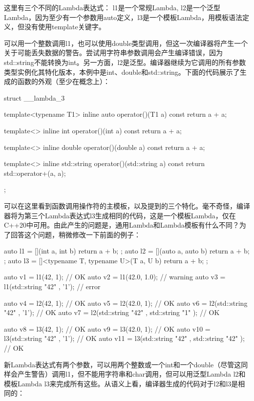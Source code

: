 这里有三个不同的Lambda表达式： l1是一个常规Lambda, l2是一个泛型Lambda，因为至少有一个参数用auto定义，l3是一个模板Lambda，用模板语法定义，但没有使用template关键字。

可以用一个整数调用l1，也可以使用double类型调用，但这一次编译器将产生一个关于可能丢失数据的警告。尝试用字符串参数调用会产生编译错误，因为std::string不能转换为int。另一方面，l2是泛型。编译器继续为它调用的所有参数类型实例化其特化版本，本例中是int、double和std::string。下面的代码展示了生成的函数的外观（至少在概念上）：

\begin{cppcode}
struct __lambda_3
{
	template<typename T1>
	inline auto operator()(T1 a) const
	{
		return a + a;
	}

	template<>
	inline int operator()(int a) const
	{
		return a + a;
	}

	template<>
	inline double operator()(double a) const
	{
		return a + a;
	}

	template<>
	inline std::string operator()(std::string a) const
	{
		return std::operator+(a, a);
	}
};
\end{cppcode}

可以在这里看到函数调用操作符的主模板，以及提到的三个特化。毫不奇怪，编译器将为第三个Lambda表达式l3生成相同的代码，这是一个模板Lambda，仅在C++20中可用。由此产生的问题是，通用Lambda和Lambda模板有什么不同？为了回答这个问题，稍微修改一下前面的例子：

\begin{cppcode}
auto l1 = [](int a, int b) {return a + b; };
auto l2 = [](auto a, auto b) {return a + b; };
auto l3 = []<typename T, typename U>(T a, U b)
          { return a + b; };
          
auto v1 = l1(42, 1); // OK
auto v2 = l1(42.0, 1.0); // warning
auto v3 = l1(std::string{ "42" }, '1'); // error

auto v4 = l2(42, 1); // OK
auto v5 = l2(42.0, 1); // OK
auto v6 = l2(std::string{ "42" }, '1'); // OK
auto v7 = l2(std::string{ "42" }, std::string{ "1" }); // OK

auto v8 = l3(42, 1); // OK
auto v9 = l3(42.0, 1); // OK
auto v10 = l3(std::string{ "42" }, '1'); // OK
auto v11 = l3(std::string{ "42" }, std::string{ "42" }); // OK
\end{cppcode}

新Lambda表达式有两个参数，可以用两个整数或一个int和一个double（尽管这同样会产生警告）调用l1，但不能用字符串和char调用，但可以用泛型Lambda l2和模板Lambda l3来完成所有这些。从语义上看，编译器生成的代码对于l2和l3是相同的：

